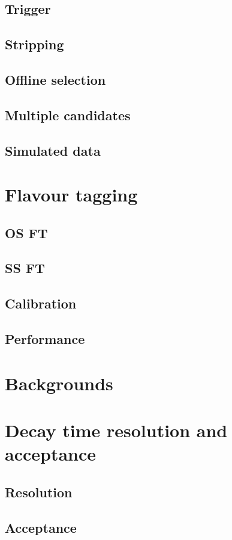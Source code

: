 \subsection{Trigger}
\subsection{Stripping}
\subsection{Offline selection}
\subsection{Multiple candidates}
\subsection{Simulated data}
\section{Flavour tagging}
\subsection{OS FT}
\subsection{SS FT}
\subsection{Calibration}
\subsection{Performance}
\section{Backgrounds}
\section{Decay time resolution and acceptance}
\subsection{Resolution}
\subsection{Acceptance}

